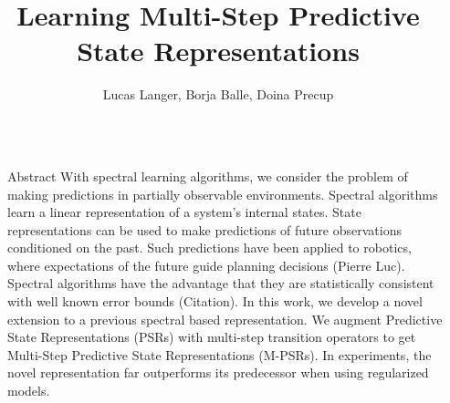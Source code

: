 \documentclass[final]{beamer}
\title{Learning Multi-Step Predictive
     State Representations} %
\author{Lucas Langer, Borja Balle, Doina Precup} %
\institute{Reasoning and Learning Lab, McGill University} %
\newlength{\sepwid}
\newlength{\onecolwid}
\begin{document}

\setlength{\belowcaptionskip}{2ex} %
\setlength\belowdisplayshortskip{2ex} %

\begin{frame}[t] %

\begin{columns}[t] %

\begin{column}{\sepwid}\end{column} %

\begin{column}{\onecolwid} %


\begin{block}{Abstract}
With spectral learning algorithms, we consider the problem of making predictions in partially observable environments. Spectral algorithms learn a linear representation of a system's internal states. State representations can be used to make predictions of future observations conditioned on the past. Such predictions have been applied to robotics, where expectations of the future guide planning decisions (Pierre Luc). 
Spectral algorithms have the advantage that they are statistically consistent with well known error bounds (Citation). In this work, we develop a novel extension to a previous spectral based representation. We augment Predictive State Representations (PSRs) with multi-step transition operators to get Multi-Step Predictive State Representations (M-PSRs). In experiments, the novel representation far outperforms its predecessor when using regularized models.

\end{block} 
 

\end{column}
\end{columns}
\end{frame}
\end{document}
